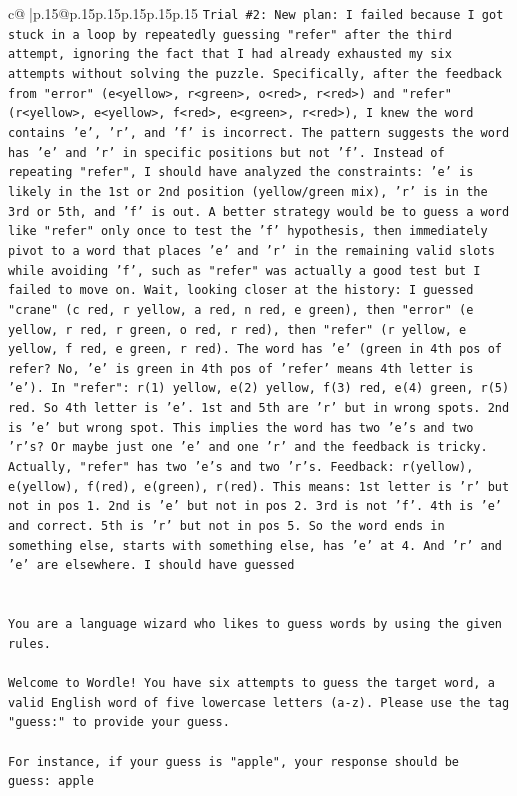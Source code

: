 \documentclass{article}
\begin{document}
{\begin{supertabular}{c@{$\;$}|p{.15\linewidth}@{}p{.15\linewidth}p{.15\linewidth}p{.15\linewidth}p{.15\linewidth}p{.15\linewidth}}
{{{\texttt{Trial \#2: New plan: I failed because I got stuck in a loop by repeatedly guessing "refer" after the third attempt, ignoring the fact that I had already exhausted my six attempts without solving the puzzle. Specifically, after the feedback from "error" (e<yellow>, r<green>, o<red>, r<red>) and "refer" (r<yellow>, e<yellow>, f<red>, e<green>, r<red>), I knew the word contains 'e', 'r', and 'f' is incorrect. The pattern suggests the word has 'e' and 'r' in specific positions but not 'f'. Instead of repeating "refer", I should have analyzed the constraints: 'e' is likely in the 1st or 2nd position (yellow/green mix), 'r' is in the 3rd or 5th, and 'f' is out. A better strategy would be to guess a word like "refer" only once to test the 'f' hypothesis, then immediately pivot to a word that places 'e' and 'r' in the remaining valid slots while avoiding 'f', such as "refer" was actually a good test but I failed to move on. Wait, looking closer at the history: I guessed "crane" (c red, r yellow, a red, n red, e green), then "error" (e yellow, r red, r green, o red, r red), then "refer" (r yellow, e yellow, f red, e green, r red). The word has 'e' (green in 4th pos of refer? No, 'e' is green in 4th pos of 'refer' means 4th letter is 'e'). In "refer": r(1) yellow, e(2) yellow, f(3) red, e(4) green, r(5) red. So 4th letter is 'e'. 1st and 5th are 'r' but in wrong spots. 2nd is 'e' but wrong spot. This implies the word has two 'e's and two 'r's? Or maybe just one 'e' and one 'r' and the feedback is tricky. Actually, "refer" has two 'e's and two 'r's. Feedback: r(yellow), e(yellow), f(red), e(green), r(red). This means: 1st letter is 'r' but not in pos 1. 2nd is 'e' but not in pos 2. 3rd is not 'f'. 4th is 'e' and correct. 5th is 'r' but not in pos 5. So the word ends in something else, starts with something else, has 'e' at 4. And 'r' and 'e' are elsewhere. I should have guessed} \\
\\ 
\\ 
\texttt{You are a language wizard who likes to guess words by using the given rules.} \\
\\ 
\texttt{Welcome to Wordle! You have six attempts to guess the target word, a valid English word of five lowercase letters (a{-}z). Please use the tag "guess:" to provide your guess.} \\
\\ 
\texttt{For instance, if your guess is "apple", your response should be} \\
\texttt{guess: apple} \\
}}}
\end{supertabular}}
\end{document}
